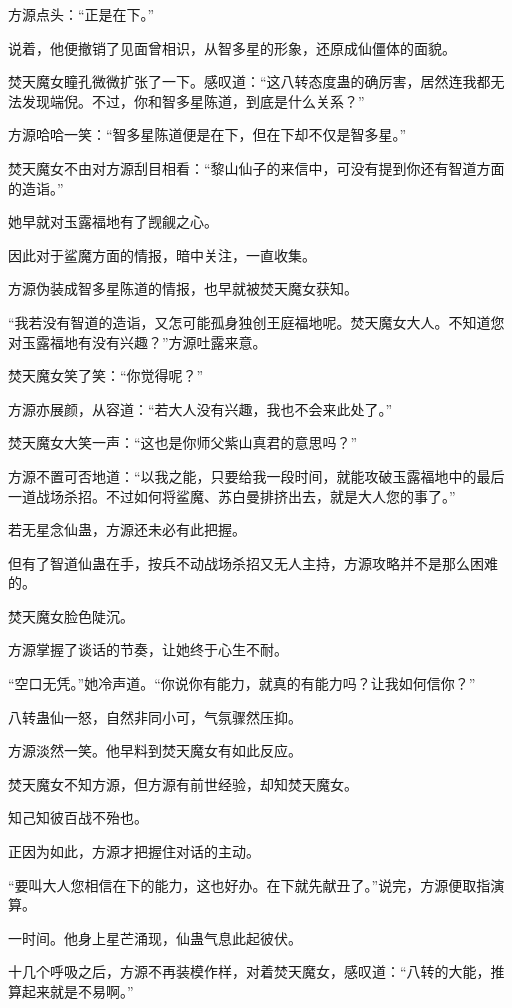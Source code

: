 \begin{this_body}
方源点头：“正是在下。”

说着，他便撤销了见面曾相识，从智多星的形象，还原成仙僵体的面貌。

焚天魔女瞳孔微微扩张了一下。感叹道：“这八转态度蛊的确厉害，居然连我都无法发现端倪。不过，你和智多星陈道，到底是什么关系？”

方源哈哈一笑：“智多星陈道便是在下，但在下却不仅是智多星。”

焚天魔女不由对方源刮目相看：“黎山仙子的来信中，可没有提到你还有智道方面的造诣。”

她早就对玉露福地有了觊觎之心。

因此对于鲨魔方面的情报，暗中关注，一直收集。

方源伪装成智多星陈道的情报，也早就被焚天魔女获知。

“我若没有智道的造诣，又怎可能孤身独创王庭福地呢。焚天魔女大人。不知道您对玉露福地有没有兴趣？”方源吐露来意。

焚天魔女笑了笑：“你觉得呢？”

方源亦展颜，从容道：“若大人没有兴趣，我也不会来此处了。”

焚天魔女大笑一声：“这也是你师父紫山真君的意思吗？”

方源不置可否地道：“以我之能，只要给我一段时间，就能攻破玉露福地中的最后一道战场杀招。不过如何将鲨魔、苏白曼排挤出去，就是大人您的事了。”

若无星念仙蛊，方源还未必有此把握。

但有了智道仙蛊在手，按兵不动战场杀招又无人主持，方源攻略并不是那么困难的。

焚天魔女脸色陡沉。

方源掌握了谈话的节奏，让她终于心生不耐。

“空口无凭。”她冷声道。“你说你有能力，就真的有能力吗？让我如何信你？”

八转蛊仙一怒，自然非同小可，气氛骤然压抑。

方源淡然一笑。他早料到焚天魔女有如此反应。

焚天魔女不知方源，但方源有前世经验，却知焚天魔女。

知己知彼百战不殆也。

正因为如此，方源才把握住对话的主动。

“要叫大人您相信在下的能力，这也好办。在下就先献丑了。”说完，方源便取指演算。

一时间。他身上星芒涌现，仙蛊气息此起彼伏。

十几个呼吸之后，方源不再装模作样，对着焚天魔女，感叹道：“八转的大能，推算起来就是不易啊。”


\end{this_body}
